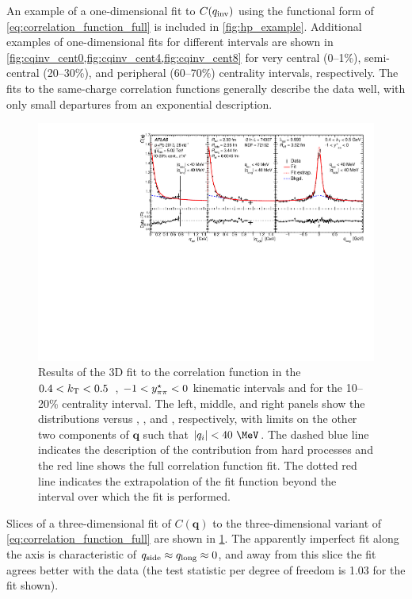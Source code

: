 An example of a one-dimensional fit to $C(q_{\mathrm{inv}})$ using the functional form of \cref{eq:correlation_function_full} is included in \cref{fig:hp_example}.
Additional examples of one-dimensional fits for different \kt intervals are shown in \cref{fig:cqinv_cent0,fig:cqinv_cent4,fig:cqinv_cent8} for very central (0--1\%), semi-central (20--30\%), and peripheral (60--70\%) centrality intervals, respectively.
The fits to the same-charge correlation functions generally describe the data well, with only small departures from an exponential description.


\begin{figure}[h]
\centering
\includegraphics[width=0.97\linewidth]{Cqosl_slices_cent3_e3_kt3_ys1.pdf}
\caption{Results of the 3D fit to the correlation function in the $0.4 < k_\mathrm{T} < 0.5$~\GeV, $-1 < y^{\star}_{\pi\pi} < 0$ kinematic intervals and for the 10--20\% centrality interval.
The left, middle, and right panels show the distributions versus \qout, \qside, and \qlong, respectively, with limits on the other two components of $\mathbf{q}$ such that $|q_i| < 40~\MeV$.
The dashed blue line indicates the description of the contribution from hard processes and the red line shows the full correlation function fit.
The dotted red line indicates the extrapolation of the fit function beyond the interval over which the fit is performed.
}
\label{fig:cqosl_slices}
\end{figure}


Slices of a three-dimensional fit of $C(\mathbf{q})$ to the three-dimensional variant of \cref{eq:correlation_function_full} are shown in \cref{fig:cqosl_slices}.
The apparently imperfect fit along the \qout axis is characteristic of $q_{\mathrm{side}} \approx q_{\mathrm{long}} \approx 0$, and away from this slice the  fit agrees better with the data (the test statistic per degree of freedom is 1.03 for the fit shown). 



